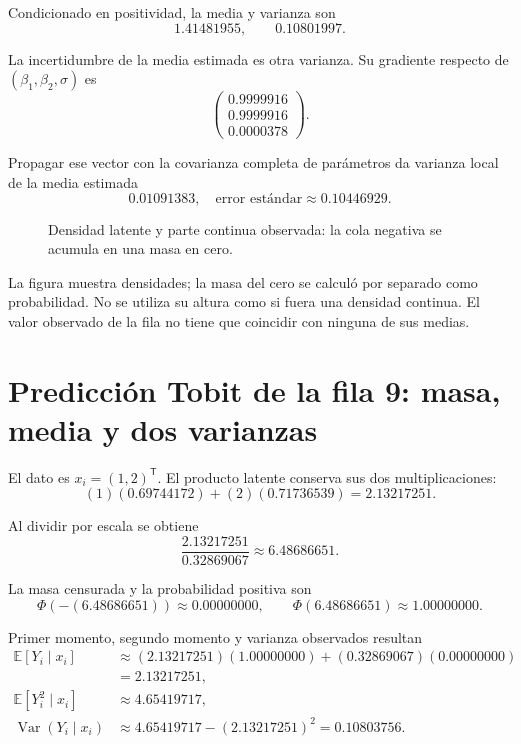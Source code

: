 \documentclass[11pt,a4paper]{article}
\newcommand{\E}{\mathbb E}
\newcommand{\T}{^{\mathsf T}}
\DeclareMathOperator{\Var}{Var}
\begin{document}
Condicionado en positividad,
la media y varianza son
\[
1.41481955,\qquad 0.10801997.
\]

La incertidumbre de la media estimada
es otra varianza.
Su gradiente respecto de
\((\beta_1,\beta_2,\sigma)\) es
\[
\begin{pmatrix}0.9999916\\0.9999916\\0.0000378\end{pmatrix}.
\]

Propagar ese vector con la
covarianza completa de parámetros
da varianza local de la
media estimada
\[
0.01091383,\quad\text{error estándar}\approx0.10446929.
\]

\begin{figure}[H]\centering
{}
\caption{Densidad latente y parte continua observada: la cola negativa se acumula en una masa en cero.}
\end{figure}

La figura muestra densidades;
la masa del cero se calculó
por separado como probabilidad.
No se utiliza su altura
como si fuera una densidad continua.
El valor observado de la fila
no tiene que coincidir
con ninguna de sus medias.

\clearpage
\section{Predicción Tobit de la fila 9: masa, media y dos varianzas}\label{unidad118}
El dato es \(x_i=(1,2)\T\).
El producto latente conserva
sus dos multiplicaciones:
\[
(1)(0.69744172)+(2)(0.71736539)=2.13217251.
\]

Al dividir por escala se obtiene
\[
\frac{2.13217251}{0.32869067}\approx6.48686651.
\]

La masa censurada y la
probabilidad positiva son
\[
\Phi(-(6.48686651))\approx0.00000000,\qquad\Phi(6.48686651)\approx1.00000000.
\]

Primer momento, segundo momento
y varianza observados resultan
\[
\begin{aligned}
\E[Y_i\mid x_i]&\approx(2.13217251)(1.00000000)+(0.32869067)(0.00000000)\\
&=2.13217251,\\
\E[Y_i^2\mid x_i]&\approx4.65419717,\\
\Var(Y_i\mid x_i)&\approx4.65419717-(2.13217251)^2=0.10803756.\end{aligned}
\]
\end{document}
